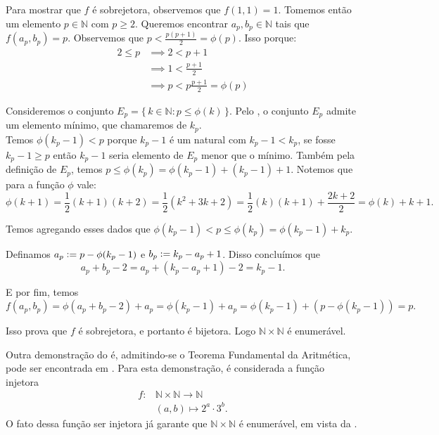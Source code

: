 \documentclass[../main.tex]{subfiles}
\begin{document}
\begin{dem}
    Para mostrar que $f$ é sobrejetora, observemos que $f(1,1) = 1$. Tomemos então um elemento $p \in \mathbb{N}$ com 
    $p \geq 2$. Queremos encontrar $a_p, b_p \in \mathbb{N}$ tais que $f(a_p,b_p) = p$.
    Observemos que $p < \frac{p(p+1)}{2} = \phi(p)$. Isso porque:
    \begin{align*}
        2 \leq p &\implies 2 < p+1 \\
        & \implies 1 < \frac{p+1}{2} \\
        & \implies p < p\frac{p+1}{2} =\phi(p) 
    \end{align*}
    
    Consideremos o conjunto $E_p = \{\,k \in \mathbb{N} : p \leq \phi(k) \,\}$.
    Pelo , o conjunto $E_p$ admite um elemento mínimo, que chamaremos de $k_p$. \\
    Temos $\phi(k_p - 1) < p$ porque $k_p - 1$ é um natural com $k_p - 1 < k_p$, se fosse $k_p - 1 \geq p$ então $k_p - 1$ seria elemento de $E_p$ menor que o mínimo.
    Também pela definição de $E_p$, temos $p \leq \phi(k_p) = \phi(k_p - 1) + (k_p - 1)+1$. Notemos que para a função $\phi$ vale:
    \[ \phi(k+1) = \frac{1}{2}(k+1)(k+2) = \frac{1}{2}(k^2 + 3k + 2) = \frac{1}{2}(k)(k+1)+\frac{2k+2}{2} = \phi(k) + k+1. \]
    
    Temos agregando esses dados que $\phi(k_p - 1) < p \leq \phi(k_p) = \phi(k_p-1) + k_p$.
    
    Definamos $a_p \vcentcolon= p - \phi(k_p-1)$ e $b_p \vcentcolon= k_p - a_p + 1$. Disso concluímos que 
    \[ a_p + b_p - 2 = a_p + (k_p - a_p + 1) - 2 = k_p - 1. \]
    
    E por fim, temos
    \[f(a_p,b_p) = \phi(a_p+b_p-2) + a_p = \phi(k_p-1) + a_p  = \phi(k_p - 1) + (p - \phi(k_p-1))= p .\]
    
    Isso prova que $f$ é sobrejetora, e portanto é bijetora. Logo $\mathbb{N} \times \mathbb{N}$ é enumerável. 
\end{dem}
\begin{obs}
    Outra demonstração do  é, admitindo-se o Teorema Fundamental da Aritmética, pode ser encontrada em \textcite[p. 9]{santos}. Para esta demonstração, é considerada a função injetora 
    \begin{align*}
        f \colon &\mathbb{N} \times \mathbb{N} \to  \mathbb{N} \\ 
        &(a,b) \mapsto 2^a \cdot 3^b.
    \end{align*}
    O fato dessa função ser injetora já garante que $\mathbb{N} \times \mathbb{N}$ é enumerável, em vista da .
\end{obs}
\end{document}
